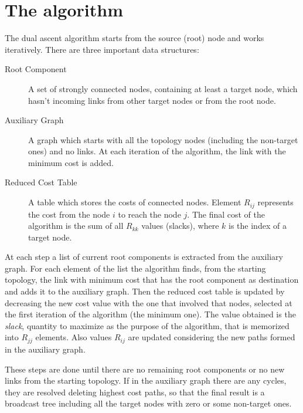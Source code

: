 \section{The algorithm}\label{sec:algorithm}

The dual ascent algorithm starts from the source (root) node and works
iteratively. There are three important data structures:

\begin{description}
	\item[Root Component] A set of strongly connected nodes, containing at
		least a target node, which hasn't incoming links from other
		target nodes or from the root node.
	\item[Auxiliary Graph] A graph which starts with all the topology nodes
		(including the non-target ones) and no links. At each iteration
		of the algorithm, the link with the minimum cost is added.
	\item[Reduced Cost Table] A table which stores the
		costs of connected nodes. Element \(R_{ij}\) represents the cost
		from the node \(i\) to reach the node \(j\). The final
		cost of the algorithm is the sum of all \(R_{kk}\) values
		(slacks), where \(k\) is the index of a target node.
\end{description}

At each step a list of current root components is extracted from the auxiliary
graph. For each element of the list the algorithm finds, from the starting
topology, the link with minimum cost that has the root component as destination
and adds it to the auxiliary graph. Then the reduced cost table is updated by
decreasing the new cost value with the one that involved that nodes, selected at
the first iteration of the algorithm (the minimum one). The value obtained is
the \emph{slack}, quantity to maximize as the purpose of the algorithm, that is
memorized into \(R_{jj}\) elements. Also values \(R_{ij}\) are updated
considering the new paths formed in the auxiliary graph.

These steps are done until there are no remaining root components or no new
links from the starting topology. If in the auxiliary graph there are any
cycles, they are resolved deleting highest cost paths, so that the final result
is a broadcast tree including all the target nodes with zero or some non-target
ones.
